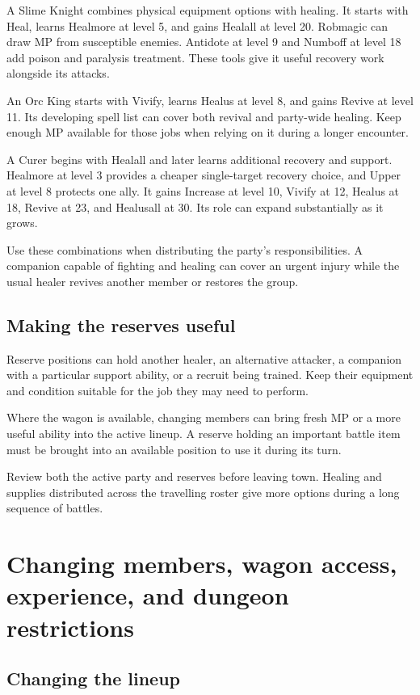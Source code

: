 A Slime Knight combines physical equipment options with healing. It
starts with Heal, learns Healmore at level 5, and gains Healall at level
20. Robmagic can draw MP from susceptible enemies. Antidote at level 9
and Numboff at level 18 add poison and paralysis treatment. These tools
give it useful recovery work alongside its attacks.

An Orc King starts with Vivify, learns Healus at level 8, and gains Revive
at level 11. Its developing spell list can cover both revival and
party-wide healing. Keep enough MP available for those jobs when relying
on it during a longer encounter.

A Curer begins with Healall and later learns additional recovery and
support. Healmore at level 3 provides a cheaper single-target recovery
choice, and Upper at level 8 protects one ally. It gains Increase at
level 10, Vivify at 12, Healus at 18, Revive at 23, and Healusall at 30.
Its role can expand substantially as it grows.

Use these combinations when distributing the party's responsibilities.
A companion capable of fighting and healing can cover an urgent injury
while the usual healer revives another member or restores the group.

\subsection*{Making the reserves useful}

Reserve positions can hold another healer, an alternative attacker,
a companion with a particular support ability, or a recruit being trained.
Keep their equipment and condition suitable for the job they may need
to perform.

Where the wagon is available, changing members can bring fresh MP or
a more useful ability into the active lineup. A reserve holding an
important battle item must be brought into an available position to use
it during its turn.

Review both the active party and reserves before leaving town. Healing
and supplies distributed across the travelling roster give more options
during a long sequence of battles.

\section{Changing members, wagon access, experience, and dungeon restrictions}

\subsection*{Changing the lineup}


